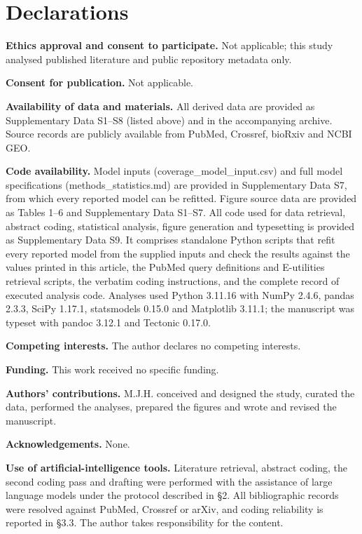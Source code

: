 \documentclass[11pt]{article}
\begin{document}
\section{Declarations}\label{declarations}

\textbf{Ethics approval and consent to participate.} Not applicable;
this study analysed published literature and public repository metadata
only.

\textbf{Consent for publication.} Not applicable.

\textbf{Availability of data and materials.} All derived data are
provided as Supplementary Data S1--S8 (listed above) and in the
accompanying archive. Source records are publicly available from PubMed,
Crossref, bioRxiv and NCBI GEO.

\textbf{Code availability.} Model inputs (coverage\_model\_input.csv)
and full model specifications (methods\_statistics.md) are provided in
Supplementary Data S7, from which every reported model can be refitted.
Figure source data are provided as Tables 1--6 and Supplementary Data
S1--S7. All code used for data retrieval, abstract coding, statistical
analysis, figure generation and typesetting is provided as Supplementary
Data S9. It comprises standalone Python scripts that refit every
reported model from the supplied inputs and check the results against
the values printed in this article, the PubMed query definitions and
E-utilities retrieval scripts, the verbatim coding instructions, and the
complete record of executed analysis code. Analyses used Python 3.11.16
with NumPy 2.4.6, pandas 2.3.3, SciPy 1.17.1, statsmodels 0.15.0 and
Matplotlib 3.11.1; the manuscript was typeset with pandoc 3.12.1 and
Tectonic 0.17.0.

\textbf{Competing interests.} The author declares no competing
interests.

\textbf{Funding.} This work received no specific funding.

\textbf{Authors' contributions.} M.J.H. conceived and designed the study,
curated the data, performed the analyses, prepared the figures and
wrote and revised the manuscript.

\textbf{Acknowledgements.} None.

\textbf{Use of artificial-intelligence tools.} Literature retrieval,
abstract coding, the second coding pass and drafting were performed with
the assistance of large language models under the protocol described in
§2. All bibliographic records were resolved against PubMed, Crossref or
arXiv, and coding reliability is reported in §3.3. The author takes
responsibility for the content.
\end{document}
